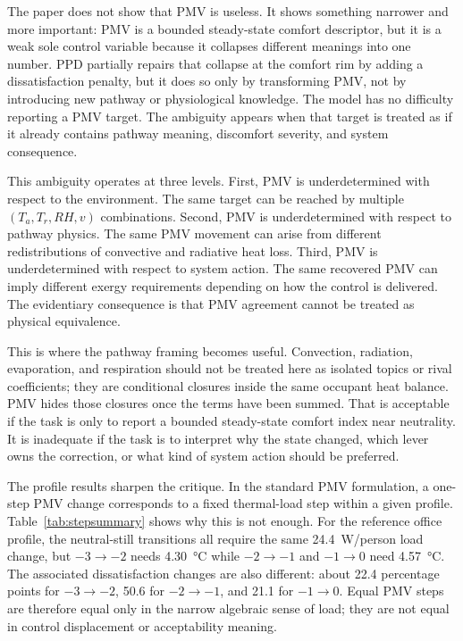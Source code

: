 \documentclass[preprint,authoryear,12pt]{elsarticle}
\begin{document}
The paper does not show that PMV is useless. It shows something narrower and more important: PMV is a bounded steady-state comfort descriptor, but it is a weak sole control variable because it collapses different meanings into one number. PPD partially repairs that collapse at the comfort rim by adding a dissatisfaction penalty, but it does so only by transforming PMV, not by introducing new pathway or physiological knowledge. The model has no difficulty reporting a PMV target. The ambiguity appears when that target is treated as if it already contains pathway meaning, discomfort severity, and system consequence.

This ambiguity operates at three levels. First, PMV is underdetermined with respect to the environment. The same target can be reached by multiple $(T_a, T_r, RH, v)$ combinations. Second, PMV is underdetermined with respect to pathway physics. The same PMV movement can arise from different redistributions of convective and radiative heat loss. Third, PMV is underdetermined with respect to system action. The same recovered PMV can imply different exergy requirements depending on how the control is delivered. The evidentiary consequence is that PMV agreement cannot be treated as physical equivalence.

This is where the pathway framing becomes useful. Convection, radiation, evaporation, and respiration should not be treated here as isolated topics or rival coefficients; they are conditional closures inside the same occupant heat balance. PMV hides those closures once the terms have been summed. That is acceptable if the task is only to report a bounded steady-state comfort index near neutrality. It is inadequate if the task is to interpret why the state changed, which lever owns the correction, or what kind of system action should be preferred.

The profile results sharpen the critique. In the standard PMV formulation, a one-step PMV change corresponds to a fixed thermal-load step within a given profile. Table~\ref{tab:stepsummary} shows why this is not enough. For the reference office profile, the neutral-still transitions all require the same \SI{24.4}{W/person} load change, but $-3 \rightarrow -2$ needs \SI{4.30}{\celsius} while $-2 \rightarrow -1$ and $-1 \rightarrow 0$ need \SI{4.57}{\celsius}. The associated dissatisfaction changes are also different: about 22.4 percentage points for $-3 \rightarrow -2$, 50.6 for $-2 \rightarrow -1$, and 21.1 for $-1 \rightarrow 0$. Equal PMV steps are therefore equal only in the narrow algebraic sense of load; they are not equal in control displacement or acceptability meaning.
\end{document}
